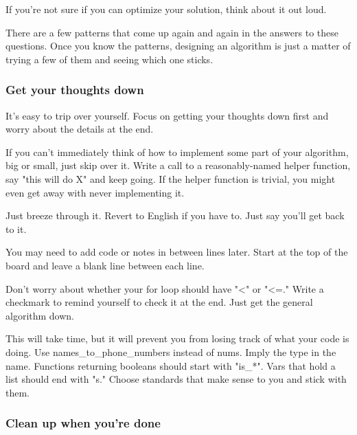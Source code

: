 \documentclass{article}
\begin{document}
 If you're not sure if you can optimize your solution, think about it out loud. 


 There are a few patterns that come up again and again in the answers to these questions. Once you know the patterns, designing an algorithm is just a matter of trying a few of them and seeing which one sticks.




\subsubsection{Get your thoughts down}

It's easy to trip over yourself. Focus on getting your thoughts down first and worry about the details at the end.



 If you can't immediately think of how to implement some part of your algorithm, big or small, just skip over it. Write a call to a reasonably-named helper function, say "this will do X" and keep going. If the helper function is trivial, you might even get away with never implementing it.


 Just breeze through it. Revert to English if you have to. Just say you'll get back to it.


 You may need to add code or notes in between lines later. Start at the top of the board and leave a blank line between each line.


 Don't worry about whether your for loop should have "<" or "<=." Write a checkmark to remind yourself to check it at the end. Just get the general algorithm down.



 This will take time, but it will prevent you from losing track of what your code is doing. Use names\_{}to\_{}phone\_{}numbers instead of nums. Imply the type in the name. Functions returning booleans should start with "is\_{}*". Vars that hold a list should end with "s." Choose standards that make sense to you and stick with them.



\subsubsection{Clean up when you're done}
\end{document}
